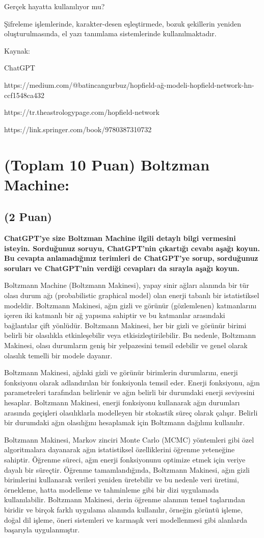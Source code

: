 \documentclass[11pt]{article}
\begin{document}
Gerçek hayatta kullanılıyor mu?

Şifreleme işlemlerinde, karakter-desen eşleştirmede, bozuk şekillerin yeniden oluşturulmasında, el yazı tanımlama sistemlerinde kullanılmaktadır.

Kaynak:

ChatGPT

https://medium.com/@batincangurbuz/hopfield-ağ-modeli-hopfield-network-hn-ccf1548ca432

https://tr.theastrologypage.com/hopfield-network

https://link.springer.com/book/9780387310732


\section{(Toplam 10 Puan) Boltzman Machine:}

\subsection{(2 Puan)} \textbf{ChatGPT’ye size Boltzman Machine ilgili detaylı bilgi vermesini isteyin. Sorduğunuz soruyu, ChatGPT'nin çıkartığı cevabı aşağı koyun. Bu cevapta anlamadığınız terimleri de ChatGPT’ye sorup, sorduğunuz soruları ve ChatGPT’nin verdiği cevapları da sırayla aşağı koyun.}


Boltzmann Machine (Boltzmann Makinesi), yapay sinir ağları alanında bir tür olası durum ağı (probabilistic graphical model) olan enerji tabanlı bir istatistiksel modeldir. Boltzmann Makinesi, ağın gizli ve görünür (gözlemlenen) katmanlarını içeren iki katmanlı bir ağ yapısına sahiptir ve bu katmanlar arasındaki bağlantılar çift yönlüdür. Boltzmann Makinesi, her bir gizli ve görünür birimi belirli bir olasılıkla etkinleşebilir veya etkisizleştirilebilir. Bu nedenle, Boltzmann Makinesi, olası durumların geniş bir yelpazesini temsil edebilir ve genel olarak olasılık temelli bir modele dayanır.

Boltzmann Makinesi, ağdaki gizli ve görünür birimlerin durumlarını, enerji fonksiyonu olarak adlandırılan bir fonksiyonla temsil eder. Enerji fonksiyonu, ağın parametreleri tarafından belirlenir ve ağın belirli bir durumdaki enerji seviyesini hesaplar. Boltzmann Makinesi, enerji fonksiyonu kullanarak ağın durumları arasında geçişleri olasılıklarla modelleyen bir stokastik süreç olarak çalışır. Belirli bir durumdaki ağın olasılığını hesaplamak için Boltzmann dağılımı kullanılır.

Boltzmann Makinesi, Markov zinciri Monte Carlo (MCMC) yöntemleri gibi özel algoritmalara dayanarak ağın istatistiksel özelliklerini öğrenme yeteneğine sahiptir. Öğrenme süreci, ağın enerji fonksiyonunu optimize etmek için veriye dayalı bir süreçtir. Öğrenme tamamlandığında, Boltzmann Makinesi, ağın gizli birimlerini kullanarak verileri yeniden üretebilir ve bu nedenle veri üretimi, örnekleme, hatta modelleme ve tahminleme gibi bir dizi uygulamada kullanılabilir.
Boltzmann Makinesi, derin öğrenme alanının temel taşlarından biridir ve birçok farklı uygulama alanında kullanılır, örneğin görüntü işleme, doğal dil işleme, öneri sistemleri ve karmaşık veri modellenmesi gibi alanlarda başarıyla uygulanmıştır.
\end{document}
